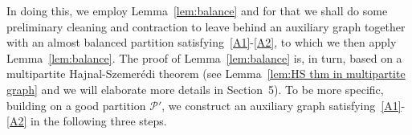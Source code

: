 \documentclass[11pt, a4paper]{article}
\theoremstyle{definition}
\newcommand{\<}{\subseteq}
\begin{document}
In doing this, we employ Lemma~\ref{lem:balance} and for that we shall do some preliminary cleaning and contraction to leave behind an auxiliary graph together with an almost balanced partition satisfying~\ref{A1}-\ref{A2}, to which we then apply Lemma~\ref{lem:balance}. The proof of Lemma~\ref{lem:balance} is, in turn, based on a multipartite Hajnal-Szemer\'{e}di theorem (see Lemma~\ref{lem:HS thm in multipartite graph} and we will elaborate more details in Section~5).
{To be more specific, building on a good partition $\mathcal{P}'$, we construct an auxiliary graph satisfying~\ref{A1}-\ref{A2} in  the following three steps.}
\end{document}
